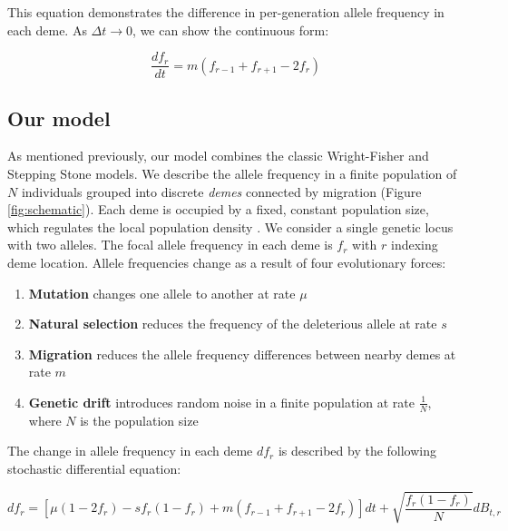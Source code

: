 This equation demonstrates the difference in per-generation allele frequency in each deme. As $\Delta t \to 0$, we can show the continuous form:

\begin{equation}
    \frac{df_r}{dt} = m(f_{r-1} + f_{r+1} -2f_r)
\end{equation}


 





\subsection{Our model} \label{"section:our_model"}

As mentioned previously, our model combines the classic Wright-Fisher and Stepping Stone models. We describe the allele frequency in a finite population of $N$ individuals grouped into discrete \textit{demes} connected by migration (Figure \ref{fig:schematic}). Each deme is occupied by a fixed, constant population size, which regulates the local population density \cite{felsenstein_1975}. We consider a single genetic locus with two alleles. The focal allele frequency in each deme is $f_r$ with $r$ indexing deme location. Allele frequencies change as a result of four evolutionary forces:


\begin{enumerate}
    \item \textbf{Mutation} changes one allele to another at rate $\mu$
    \item \textbf{Natural selection} reduces the frequency of the deleterious allele at rate $s$
    \item \textbf{Migration} reduces the allele frequency differences between nearby demes at rate $m$
    \item \textbf{Genetic drift} introduces random noise in a finite population at rate $\frac{1}{N}$, \\ where $N$ is the population size
\end{enumerate}


The change in allele frequency in each deme $df_r$ is described by the following stochastic differential equation:

\begin{equation}
    \label{eq:model}
    df_r=[\mu(1-2f_r)-sf_r (1-f_r ) + m (f_{r-1}+f_{r+1}-2f_r)]dt+\sqrt{\frac{f_r (1-f_r )}{N}} dB_{t,r}
\end{equation}


